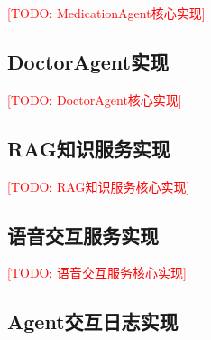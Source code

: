 \textcolor{red}{[TODO: MedicationAgent核心实现]}


\subsection{DoctorAgent实现}

\textcolor{red}{[TODO: DoctorAgent核心实现]}


\subsection{RAG知识服务实现}

\textcolor{red}{[TODO: RAG知识服务核心实现]}



\subsection{语音交互服务实现}

\textcolor{red}{[TODO: 语音交互服务核心实现]}


\subsection{Agent交互日志实现}

